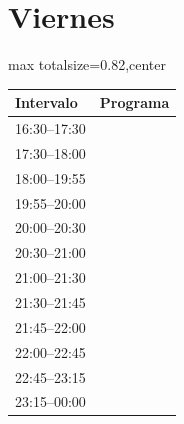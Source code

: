 \documentclass[11pt,a4paper]{article}
\begin{document}
\clearpage
\section*{Viernes}
\begin{center}
\begin{adjustbox}{max totalsize={\textwidth}{0.82\textheight},center}
\begin{tabular}{|p{3.6cm}|p{11cm}|}
\hline
\textbf{Intervalo} & \textbf{Programa} \\
\hline
{\centering\rule{0pt}{11.20ex}16:30--17:30} & {\centering\rule{0pt}{11.20ex}} \\
{\centering\rule{0pt}{5.60ex}17:30--18:00} & {\centering\rule{0pt}{5.60ex}} \\
{\centering\rule{0pt}{21.47ex}18:00--19:55} & {\centering\rule{0pt}{21.47ex}} \\
{\centering\rule{0pt}{0.93ex}19:55--20:00} & {\centering\rule{0pt}{0.93ex}} \\
{\centering\rule{0pt}{5.60ex}20:00--20:30} & {\centering\rule{0pt}{5.60ex}} \\
{\centering\rule{0pt}{5.60ex}20:30--21:00} & {\centering\rule{0pt}{5.60ex}} \\
{\centering\rule{0pt}{5.60ex}21:00--21:30} & {\centering\rule{0pt}{5.60ex}} \\
{\centering\rule{0pt}{2.80ex}21:30--21:45} & {\centering\rule{0pt}{2.80ex}} \\
{\centering\rule{0pt}{2.80ex}21:45--22:00} & {\centering\rule{0pt}{2.80ex}} \\
{\centering\rule{0pt}{8.40ex}22:00--22:45} & {\centering\rule{0pt}{8.40ex}} \\
{\centering\rule{0pt}{5.60ex}22:45--23:15} & {\centering\rule{0pt}{5.60ex}} \\
{\centering\rule{0pt}{8.40ex}23:15--00:00} & {\centering\rule{0pt}{8.40ex}} \\
\hline
\end{tabular}
\end{adjustbox}
\end{center}

\clearpage
\end{document}
